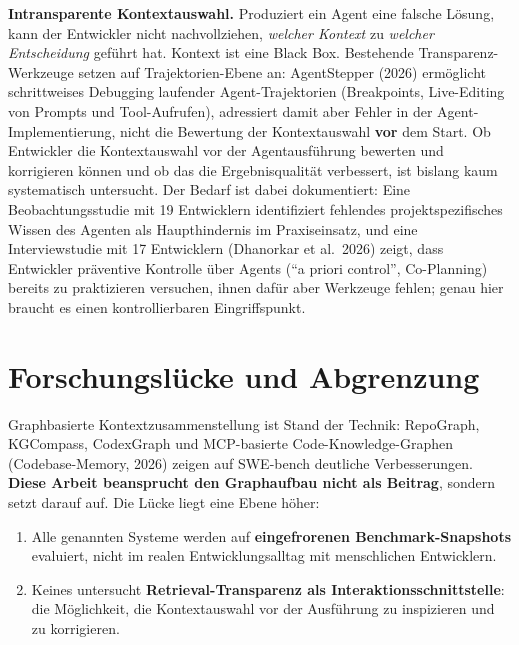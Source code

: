 \documentclass[12pt,a4paper]{scrartcl}
\begin{document}
\textbf{Intransparente Kontextauswahl.} Produziert ein Agent eine falsche Lösung, kann der
Entwickler nicht nachvollziehen, \emph{welcher Kontext} zu \emph{welcher Entscheidung}
geführt hat. Kontext ist eine Black Box. Bestehende Transparenz-Werkzeuge setzen auf
Trajektorien-Ebene an: AgentStepper (2026) ermöglicht schrittweises Debugging laufender
Agent-Trajektorien (Breakpoints, Live-Editing von Prompts und Tool-Aufrufen), adressiert damit
aber Fehler in der Agent-Implementierung, nicht die Bewertung der Kontextauswahl
\textbf{vor} dem Start. Ob Entwickler die Kontextauswahl vor der Agentausführung bewerten und
korrigieren können und ob das die Ergebnisqualität verbessert, ist bislang kaum
systematisch untersucht. Der Bedarf ist dabei dokumentiert: Eine Beobachtungsstudie mit 19 Entwicklern
identifiziert fehlendes projektspezifisches Wissen des Agenten als Haupthindernis im
Praxiseinsatz, und eine Interviewstudie mit 17 Entwicklern (Dhanorkar et al.\ 2026) zeigt,
dass Entwickler präventive Kontrolle über Agents (\enquote{a priori control}, Co-Planning)
bereits zu praktizieren versuchen, ihnen dafür aber Werkzeuge fehlen; genau hier braucht es
einen kontrollierbaren Eingriffspunkt.

\section{Forschungslücke und Abgrenzung}

Graphbasierte Kontextzusammenstellung ist Stand der Technik: RepoGraph, KGCompass, CodexGraph
und MCP-basierte Code-Knowledge-Graphen (Codebase-Memory, 2026) zeigen auf SWE-bench deutliche
Verbesserungen. \textbf{Diese Arbeit beansprucht den Graphaufbau nicht als Beitrag}, sondern
setzt darauf auf. Die Lücke liegt eine Ebene höher:

\begin{enumerate}[leftmargin=1.6em]
  \item Alle genannten Systeme werden auf \textbf{eingefrorenen Benchmark-Snapshots} evaluiert,
    nicht im realen Entwicklungsalltag mit menschlichen Entwicklern.
  \item Keines untersucht \textbf{Retrieval-Transparenz als Interaktionsschnittstelle}: die
    Möglichkeit, die Kontextauswahl vor der Ausführung zu inspizieren und zu korrigieren.
\end{enumerate}
\end{document}
